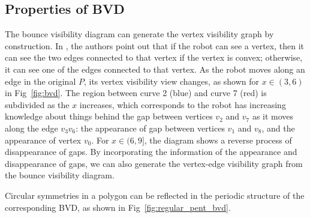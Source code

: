 \documentclass[letterpaper, 10 pt, conference]{ieeeconf}  %
\begin{document}
\subsection{Properties of BVD}
The bounce visibility diagram can generate the vertex visibility graph by construction. In \cite{rourke_viz}, the authors point out that if the robot can see a vertex, then it can see the two edges connected to that vertex if the vertex is convex; otherwise, it can see one of the edges connected to that vertex. As the robot moves along an edge in the original $P$, its vertex visibility view changes, as shown for $x\in (3, 6)$ in Fig~\ref{fig:bvd}. The region between curve 2 (blue) and curve 7 (red) is subdivided as the $x$ increases, which corresponds to the robot has increasing knowledge about things behind the gap between vertices $v_2$ and $v_7$ as it moves along the edge $v_3v_6$: the appearance of gap between vertices $v_1$ and $v_8$, and the appearance of vertex $v_0$. For $x\in (6, 9]$, the diagram shows a reverse process of disappearance of gaps. By incorporating the information of the appearance and disappearance of gaps, we can also generate the vertex-edge visibility graph from the bounce visibility diagram. 

Circular symmetries in a polygon can be reflected in the periodic structure of the corresponding BVD, as shown in Fig~\ref{fig:regular_pent_bvd}.
\end{document}

